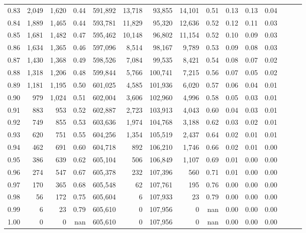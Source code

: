 \begin{tabular}{rrrrrrrrrrrrrrr}
0.83 &   2,049 &  1,620 &  0.44 &  591,892 &   13,718 &   93,855 &   14,101 &  0.51 &  0.13 &  0.13 &      0.04 \\
0.84 &   1,889 &  1,465 &  0.44 &  593,781 &   11,829 &   95,320 &   12,636 &  0.52 &  0.12 &  0.11 &      0.03 \\
0.85 &   1,681 &  1,482 &  0.47 &  595,462 &   10,148 &   96,802 &   11,154 &  0.52 &  0.10 &  0.09 &      0.03 \\
0.86 &   1,634 &  1,365 &  0.46 &  597,096 &    8,514 &   98,167 &    9,789 &  0.53 &  0.09 &  0.08 &      0.03 \\
0.87 &   1,430 &  1,368 &  0.49 &  598,526 &    7,084 &   99,535 &    8,421 &  0.54 &  0.08 &  0.07 &      0.02 \\
0.88 &   1,318 &  1,206 &  0.48 &  599,844 &    5,766 &  100,741 &    7,215 &  0.56 &  0.07 &  0.05 &      0.02 \\
0.89 &   1,181 &  1,195 &  0.50 &  601,025 &    4,585 &  101,936 &    6,020 &  0.57 &  0.06 &  0.04 &      0.01 \\
0.90 &     979 &  1,024 &  0.51 &  602,004 &    3,606 &  102,960 &    4,996 &  0.58 &  0.05 &  0.03 &      0.01 \\
0.91 &     883 &    953 &  0.52 &  602,887 &    2,723 &  103,913 &    4,043 &  0.60 &  0.04 &  0.03 &      0.01 \\
0.92 &     749 &    855 &  0.53 &  603,636 &    1,974 &  104,768 &    3,188 &  0.62 &  0.03 &  0.02 &      0.01 \\
0.93 &     620 &    751 &  0.55 &  604,256 &    1,354 &  105,519 &    2,437 &  0.64 &  0.02 &  0.01 &      0.01 \\
0.94 &     462 &    691 &  0.60 &  604,718 &      892 &  106,210 &    1,746 &  0.66 &  0.02 &  0.01 &      0.00 \\
0.95 &     386 &    639 &  0.62 &  605,104 &      506 &  106,849 &    1,107 &  0.69 &  0.01 &  0.00 &      0.00 \\
0.96 &     274 &    547 &  0.67 &  605,378 &      232 &  107,396 &      560 &  0.71 &  0.01 &  0.00 &      0.00 \\
0.97 &     170 &    365 &  0.68 &  605,548 &       62 &  107,761 &      195 &  0.76 &  0.00 &  0.00 &      0.00 \\
0.98 &      56 &    172 &  0.75 &  605,604 &        6 &  107,933 &       23 &  0.79 &  0.00 &  0.00 &      0.00 \\
0.99 &       6 &     23 &  0.79 &  605,610 &        0 &  107,956 &        0 &   nan &  0.00 &  0.00 &      0.00 \\
1.00 &       0 &      0 &   nan &  605,610 &        0 &  107,956 &        0 &   nan &  0.00 &  0.00 &      0.00 \\
\bottomrule
\end{tabular}
